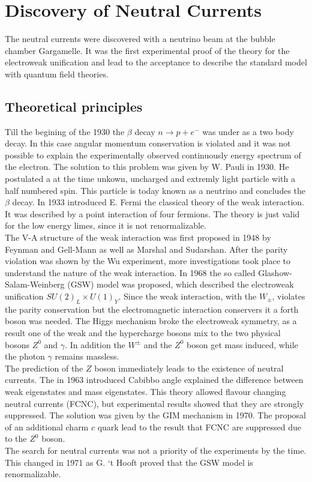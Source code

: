 \section{Discovery of Neutral Currents \cite{NC}}
The neutral currents were discovered with a neutrino beam at the bubble chamber Gargamelle. It was the first experimental proof of the theory for the electroweak unification and lead to the acceptance to describe the standard model with quantum field theories.
\subsection{Theoretical principles}
Till the begining of the 1930 the $\beta$ decay $n\rightarrow p + e^{-}$ was under as a two body decay. In this case angular momentum conservation is violated and it was not possible to explain the experimentally observed continuously energy spectrum of the electron. The solution to this problem was given by W. Pauli in 1930. He postulated a at the time unkown, uncharged and extremly light particle with a half numbered spin. This particle is today known as a neutrino and concludes the $\beta$ decay. In 1933 introduced E. Fermi the classical theory of the weak interaction. It was described by a point interaction of four fermions. The theory is just valid for the low energy limes, since it is not renormalizable.\\
The V-A structure of the weak interaction was first proposed in 1948 by Feynman and Gell-Mann as well as Marshal and Sudarshan. After the parity violation was shown by the Wu experiment, more investigations took place to understand the nature of the weak interaction. In 1968 the so called Glashow-Salam-Weinberg (GSW) model was proposed, which described the electroweak unification $SU(2)_{L}\times U(1)_{Y}$. Since the weak interaction, with the $W_{\pm}$, violates the parity conservation but the electromagnetic interaction conservers it a forth boson was needed. The Higgs mechanism broke the electroweak symmetry, as a result one of the weak and the hypercharge bosons mix to the two physical bosons $Z^0$ and $\gamma$. In addition the $W^{\pm}$ and the $Z^0$ boson get mass induced, while the photon $\gamma$ remains massless.\\
The prediction of the $Z$ boson immediately leads to the existence of neutral currents. The in 1963 introduced Cabibbo angle explained the difference between weak eigenstates and mass eigenstates. This theory allowed flavour changing neutral currents (FCNC), but experimental results showed that they are strongly suppressed. The solution was given by the GIM mechanism in 1970. The proposal of an additional charm $c$ quark lead to the result that FCNC are suppressed due to the $Z^0$ boson.\\
The search for neutral currents was not a priority of the experiments by the time. This changed in 1971 as G. `t Hooft proved that the GSW model is renormalizable.

